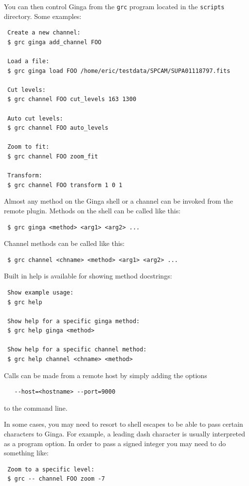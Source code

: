 \documentclass[11pt]{report}
\begin{document}
You can then control Ginga from the {\tt grc} program located in the 
{\tt scripts} directory.  Some examples:
\begin{verbatim}
 Create a new channel:
 $ grc ginga add_channel FOO
 
 Load a file:
 $ grc ginga load FOO /home/eric/testdata/SPCAM/SUPA01118797.fits

 Cut levels:
 $ grc channel FOO cut_levels 163 1300

 Auto cut levels:
 $ grc channel FOO auto_levels

 Zoom to fit:
 $ grc channel FOO zoom_fit
 
 Transform:
 $ grc channel FOO transform 1 0 1
\end{verbatim}

Almost any method on the Ginga shell or a channel can be invoked from
the remote plugin.  Methods on the shell can be called like this:
\begin{verbatim}
 $ grc ginga <method> <arg1> <arg2> ...
\end{verbatim}

Channel methods can be called like this:

\begin{verbatim}
 $ grc channel <chname> <method> <arg1> <arg2> ...
\end{verbatim}

Built in help is available for showing method docstrings:
\begin{verbatim}
 Show example usage:
 $ grc help

 Show help for a specific ginga method:
 $ grc help ginga <method>

 Show help for a specific channel method:
 $ grc help channel <chname> <method>
\end{verbatim}

Calls can be made from a remote host by simply adding the options
\begin{verbatim}
   --host=<hostname> --port=9000
\end{verbatim}
to the command line.

In some cases, you may need to resort to shell escapes to be able to
pass certain characters to Ginga.  For example, a leading dash character is
usually interpreted as a program option.  In order to pass a signed
integer you may need to do something like:
\begin{verbatim}
 Zoom to a specific level:
 $ grc -- channel FOO zoom -7
\end{verbatim}
\end{document}
